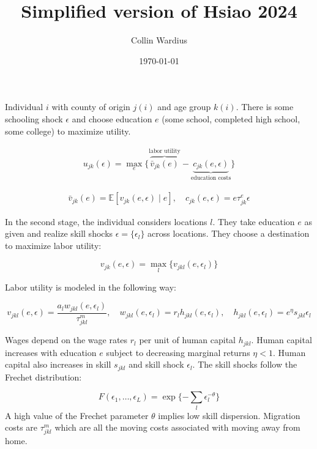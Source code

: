 \documentclass[12pt]{article}
\title{Simplified version of Hsiao 2024}
\author{Collin Wardius}
\date{\today}
\begin{document}
\maketitle


Individual $i$ with county of origin $j(i)$ and age group $k(i)$. There is some schooling shock $\epsilon$ and choose education $e$ (some school, completed high school, some college) to maximize utility.

\begin{align}
    u_{jk}(\epsilon) = \max_e\{\overbrace{\bar v_{jk}(e)}^{\text{labor utility}} - \underbrace{c_{jk}(e,\epsilon)}_{\text{education costs}}\}
\end{align}

\begin{align}
    \bar v_{jk}(e) = \mathbb{E}[v_{jk}(e,\epsilon)\mid e], \quad c_{jk}(e,\epsilon) = e\tau_{jk}^e\epsilon
\end{align}

In the second stage, the individual considers locations $l$. They take education $e$ as given and realize skill shocks $\epsilon = \{\epsilon_l\}$ across locations. They choose a destination to maximize labor utility: 

\begin{equation}
    v_{jk}(e,\epsilon) = \max_l\{v_{jkl}(e,\epsilon_l)\}    
\end{equation}

Labor utility is modeled in the following way:

\begin{equation}
    v_{jkl}(e,\epsilon) = \frac{a_lw_{jkl}(e,\epsilon_l)}{\tau_{jkl}^m},\quad w_{jkl}(e,\epsilon_l) = r_lh_{jkl}(e,\epsilon_l),\quad h_{jkl}(e,\epsilon_l) = e^\eta s_{jkl} \epsilon_l
\end{equation}

Wages depend on the wage rates $r_l$ per unit of human capital $h_{jkl}$. Human capital increases with education $e$ subject to decreasing marginal returns $\eta <1$. Human capital also increases in skill $s_{jkl}$ and skill shock $\epsilon_l$. The skill shocks follow the Frechet distribution: 

\begin{equation}
    F(\epsilon_1,\ldots, \epsilon_L) = \exp \{-\sum_l\epsilon_l^{-\theta}\}
\end{equation}
A high value of the Frechet parameter $\theta$ implies low skill dispersion. Migration costs are $\tau^m_{jkl}$ which are all the moving costs associated with moving away from home.
\end{document}
